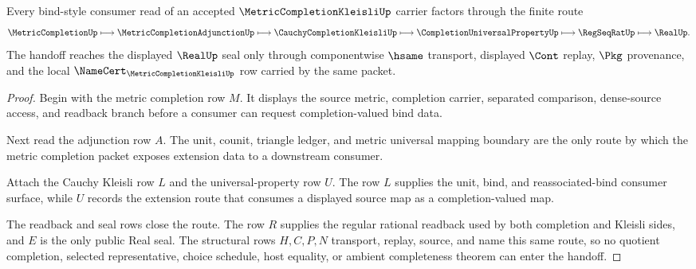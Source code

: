 \begin{theorem}
\label{thm:metric-completion-kleisli-bind-handoff}
Every bind-style consumer read of an accepted $\MetricCompletionKleisliUp$ carrier factors through the finite route
$$
\MetricCompletionUp
\longmapsto
\MetricCompletionAdjunctionUp
\longmapsto
\CauchyCompletionKleisliUp
\longmapsto
\CompletionUniversalPropertyUp
\longmapsto
\RegSeqRatUp
\longmapsto
\RealUp .
$$
The handoff reaches the displayed $\RealUp$ seal only through componentwise $\hsame$ transport, displayed $\Cont$ replay, $\Pkg$ provenance, and the local $\NameCert_{\MetricCompletionKleisliUp}$ row carried by the same packet.
\end{theorem}
\begin{proof}
Begin with the metric completion row $M$. It displays the source metric, completion carrier, separated comparison, dense-source access, and readback branch before a consumer can request completion-valued bind data.

Next read the adjunction row $A$. The unit, counit, triangle ledger, and metric universal mapping boundary are the only route by which the metric completion packet exposes extension data to a downstream consumer.

Attach the Cauchy Kleisli row $L$ and the universal-property row $U$. The row $L$ supplies the unit, bind, and reassociated-bind consumer surface, while $U$ records the extension route that consumes a displayed source map as a completion-valued map.

The readback and seal rows close the route. The row $R$ supplies the regular rational readback used by both completion and Kleisli sides, and $E$ is the only public Real seal. The structural rows $H,C,P,N$ transport, replay, source, and name this same route, so no quotient completion, selected representative, choice schedule, host equality, or ambient completeness theorem can enter the handoff.
\end{proof}


